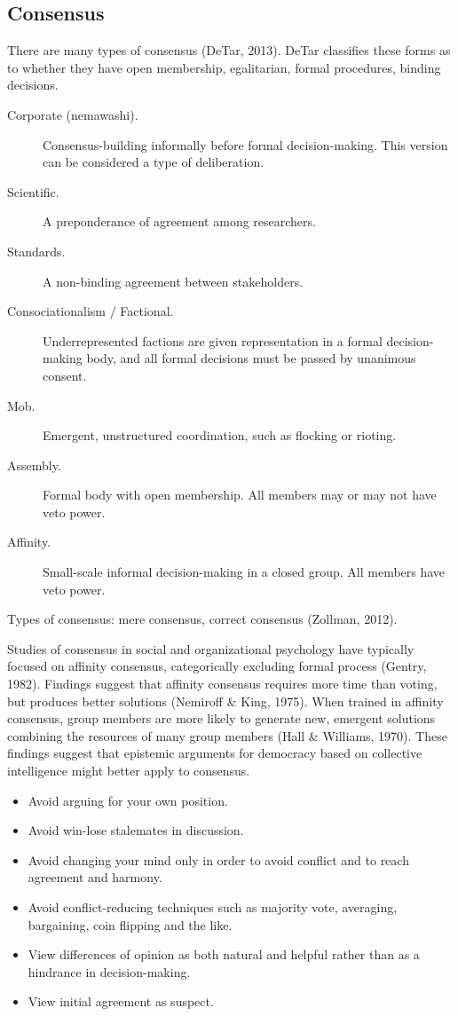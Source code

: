 \subsection{Consensus}
There are many types of consensus (DeTar, 2013). DeTar classifies these forms as to whether they have open membership, egalitarian, formal procedures, binding decisions.

\begin{description}
\item[Corporate (nemawashi).]{Consensus-building informally before formal decision-making. This version can be considered a type of deliberation.}
\item[Scientific.]{A preponderance of agreement among researchers.}
\item[Standards.]{A non-binding agreement between stakeholders.}
\item[Consociationalism / Factional.]{Underrepresented factions are given representation in a formal decision-making body, and all formal decisions must be passed by unanimous consent.}
\item[Mob.]{Emergent, unstructured coordination, such as flocking or rioting.}
\item[Assembly.]{Formal body with open membership. All members may or may not have veto power.}
\item[Affinity.]{Small-scale informal decision-making in a closed group. All members have veto power.}
\end{description}

Types of consensus: mere consensus, correct consensus (Zollman, 2012).

Studies of consensus in social and organizational psychology have typically focused on affinity consensus, categorically excluding formal process (Gentry, 1982). Findings suggest that affinity consensus requires more time than voting, but produces better solutions (Nemiroff \& King, 1975). When trained in affinity consensus, group members are more likely to generate new, emergent solutions combining the resources of many group members (Hall \& Williams, 1970). These findings suggest that epistemic arguments for democracy based on collective intelligence might better apply to consensus.
\begin{itemize}
\item{Avoid arguing for your own position.}
\item{Avoid win-lose stalemates in discussion.}
\item{Avoid changing your mind only in order to avoid conflict and to reach agreement and harmony.}
\item{Avoid conflict-reducing techniques such as majority vote, averaging, bargaining, coin flipping and the like.}
\item{View differences of opinion as both natural and helpful rather than as a hindrance in decision-making.}
\item{View initial agreement as suspect.}
\end{itemize}


